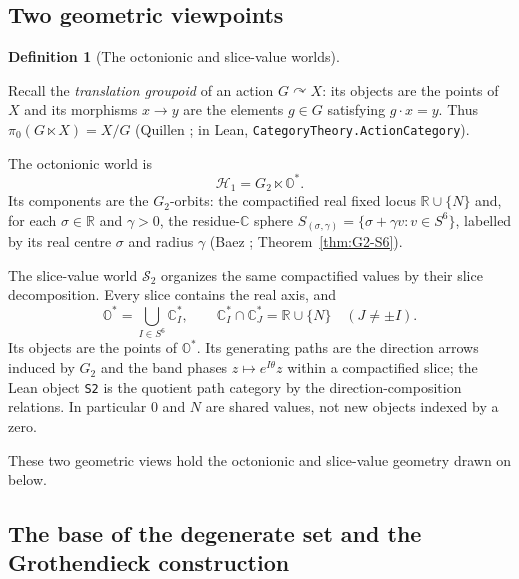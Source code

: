 \documentclass[11pt]{article}
\newcommand{\OO}{\mathbb{O}}
\newcommand{\CC}{\mathbb{C}}
\newcommand{\RR}{\mathbb{R}}
\providecommand{\Gtwo}{G_2}
\providecommand{\lean}[1]{}
\providecommand{\uses}[1]{}
\theoremstyle{plain}
\theoremstyle{definition}
\newtheorem{definition}[theorem]{Definition}
\theoremstyle{remark}
\begin{document}
\subsection*{Two geometric viewpoints}

\begin{definition}[The octonionic and slice-value worlds]\label{def:two-worlds}
\lean{H1, SphereWorld}
\uses{def:carrier, def:G2, thm:G2-S6, rmk:G2-compact, def:slices}
Recall the \emph{translation groupoid} of an action $G\curvearrowright X$: its objects are the
points of $X$ and its morphisms $x\to y$ are the elements $g\in G$ satisfying $g\cdot x=y$.
Thus $\pi_0(G\ltimes X)=X/G$ (Quillen \cite[\S1]{Quillen73}; in Lean,
\texttt{CategoryTheory.ActionCategory}).

The octonionic world is
\[
  \mathcal H_1=\Gtwo\ltimes\OO^{*}.
\]
Its components are the $\Gtwo$-orbits: the compactified real fixed locus $\RR\cup\{N\}$ and,
for each $\sigma\in\RR$ and $\gamma>0$, the residue-$\CC$ sphere
$S_{(\sigma,\gamma)}=\{\sigma+\gamma v:v\in S^6\}$, labelled by its real centre $\sigma$ and
radius $\gamma$ (Baez \cite{Baez02}; Theorem~\ref{thm:G2-S6}).

The slice-value world $\mathcal S_2$ organizes the same compactified values by their slice
decomposition. Every slice contains the real axis, and
\[
  \OO^{*}=\bigcup_{I\in S^6}\CC_I^{*},\qquad
  \CC_I^{*}\cap\CC_J^{*}=\RR\cup\{N\}\quad(J\neq\pm I).
\]
Its objects are the points of $\OO^{*}$. Its generating paths are the direction arrows induced
by $\Gtwo$ and the band phases $z\mapsto e^{I\theta}z$ within a compactified slice; the Lean
object \texttt{S2} is the quotient path category by the direction-composition relations. In
particular $0$ and $N$ are shared values, not new objects indexed by a zero.

These two geometric views hold the octonionic and slice-value geometry drawn on below.
\end{definition}

\subsection*{The base of the degenerate set and the Grothendieck construction}
\end{document}
